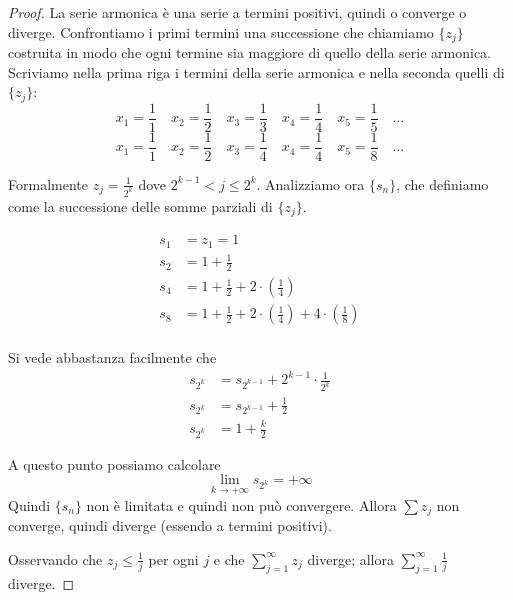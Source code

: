\begin{proof}
La serie armonica è una serie a termini positivi, quindi o converge o diverge. Confrontiamo i primi termini una successione che chiamiamo $\{z_j\}$ costruita in modo che ogni termine sia maggiore di quello della serie armonica. Scriviamo nella prima riga i termini della serie armonica e nella seconda quelli di $\{z_j\}$:
\begin{equation*}
x_1 = \frac{1}{1} \quad x_2 = \frac{1}{2} \quad x_3 = \frac{1}{3} \quad x_4 = \frac{1}{4} \quad x_5 = \frac{1}{5} \quad \ldots 
\end{equation*}
\begin{equation*}
x_1 = \frac{1}{1} \quad x_2 = \frac{1}{2} \quad x_3 = \frac{1}{4} \quad x_4 = \frac{1}{4} \quad x_5 = \frac{1}{8} \quad \ldots 
\end{equation*}

Formalmente $z_j = \frac{1}{2^k}$ dove $2^{k-1} < j \le 2^k$. Analizziamo ora $\{s_n\}$, che definiamo come la successione delle somme parziali di $\{z_j\}$.

\begin{align*}
s_1 &= z_1 = 1 \\
s_2 &= 1 + \frac{1}{2} \\
s_4 &= 1 + \frac{1}{2} + 2 \cdot \left(\frac{1}{4}\right) \\
s_8 &= 1 + \frac{1}{2} + 2 \cdot \left(\frac{1}{4}\right) + 4 \cdot \left(\frac{1}{8}\right)\\
\end{align*}

Si vede abbastanza facilmente che
\begin{align*}
s_{2^k} &= s_{2^{k-1}} + 2^{k-1} \cdot \frac{1}{2^k} \\
s_{2^k} &= s_{2^{k-1}} + \frac{1}{2} \\
s_{2^k} &= 1 + \frac{k}{2}
\end{align*}

A questo punto possiamo calcolare 
\begin{equation*}
\lim_{k \to +\infty} s_{2^k} = +\infty
\end{equation*}
Quindi $\{s_n\}$ non è limitata e quindi non può convergere. Allora $\sum z_j$ non converge, quindi diverge (essendo a termini positivi).

Osservando che $z_j \le \frac{1}{j}$ per ogni $j$ e che $\sum_{j=1}^\infty z_j$ diverge; allora $\sum_{j=1}^\infty \frac{1}{j}$ diverge.

\end{proof}

